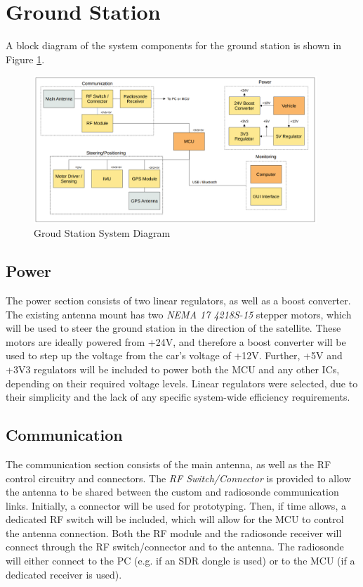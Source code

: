 \graphicspath{{./figures}}

\section{Ground Station}
A block diagram of the system components for the ground station is shown in Figure \ref{fig:gs_system}.

\begin{figure}[!htb]
  \centering
  \includegraphics[width=0.95\textwidth]{gs_system}
  \caption{Groud Station System Diagram}
  \label{fig:gs_system}
\end{figure}

\subsection{Power}
The power section consists of two linear regulators, as well as a boost converter. The existing antenna mount has two \textit{NEMA 17 4218S-15} stepper motors, which will be used to steer the ground station in the direction of the satellite. These motors are ideally powered from +24V, and therefore a boost converter will be used to step up the voltage from the car's voltage of +12V. Further, +5V and +3V3 regulators will be included to power both the MCU and any other ICs, depending on their required voltage levels. Linear regulators were selected, due to their simplicity and the lack of any specific system-wide efficiency requirements.

\subsection{Communication}
The communication section consists of the main antenna, as well as the RF control circuitry and connectors. The \textit{RF Switch/Connector} is provided to allow the antenna to be shared between the custom and radiosonde communication links. Initially, a connector will be used for prototyping. Then, if time allows, a dedicated RF switch will be included, which will allow for the MCU to control the antenna connection. Both the RF module and the radiosonde receiver will connect through the RF switch/connector and to the antenna. The radiosonde will either connect to the PC (e.g. if an SDR dongle is used) or to the MCU (if a dedicated receiver is used).

